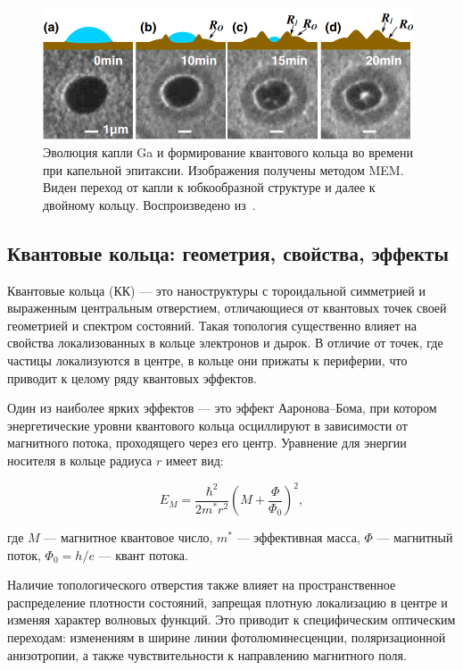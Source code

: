 \documentclass[14pt,oneside]{extarticle}
\begin{document}
\begin{figure}
    \begin{center}
        \includegraphics[width=11cm]{images/Zhou1-Firgure1.png}
        \caption{\label{fig:zhou1}
            Эволюция капли Ga и формирование квантового кольца во времени при капельной эпитаксии. Изображения получены методом MEM. Виден переход от капли к юбкообразной структуре и далее к двойному кольцу. Воспроизведено из~\cite{zhou2013}.}
    \end{center}
\end{figure}

\subsection{Квантовые кольца: геометрия, свойства, эффекты}

Квантовые кольца (КК) — это наноструктуры с тороидальной симметрией и выраженным центральным отверстием, отличающиеся от квантовых точек своей геометрией и спектром состояний. Такая топология существенно влияет на свойства локализованных в кольце электронов и дырок. В отличие от точек, где частицы локализуются в центре, в кольце они прижаты к периферии, что приводит к целому ряду квантовых эффектов.

Один из наиболее ярких эффектов — это эффект Ааронова–Бома, при котором энергетические уровни квантового кольца осциллируют в зависимости от магнитного потока, проходящего через его центр. Уравнение для энергии носителя в кольце радиуса $r$ имеет вид:

\[
E_M = \frac{\hbar^2}{2m^* r^2} \left( M + \frac{\Phi}{\Phi_0} \right)^2,
\]

где $M$ — магнитное квантовое число, $m^*$ — эффективная масса, $\Phi$ — магнитный поток, $\Phi_0 = h/e$ — квант потока.

Наличие топологического отверстия также влияет на пространственное распределение плотности состояний, запрещая плотную локализацию в центре и изменяя характер волновых функций. Это приводит к специфическим оптическим переходам: изменениям в ширине линии фотолюминесценции, поляризационной анизотропии, а также чувствительности к направлению магнитного поля.
\end{document}

